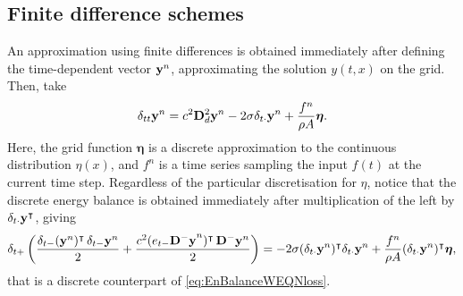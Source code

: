 \documentclass[11pt,twoside,a4paper,english]{book}
\newcommand{\etm}{e_{t-}}
\newcommand{\dtp}{\delta_{t+}}
\newcommand{\dtm}{\delta_{t-}}
\newcommand{\dtd}{\delta_{t\cdot}}
\newcommand{\dtt}{\delta_{tt}}
\begin{document}
\subsection{Finite difference schemes}

An approximation using finite differences is obtained immediately after defining the time-dependent vector ${\bf y}^n$, approximating the solution $y(t,x)$ on the grid. Then, take
\begin{equation}
\dtt {\bf y}^n = c^2 {\bf D}^2_d {\bf y}^n - 2\sigma \dtd {\bf y}^n + \frac{f^n}{\rho A}{\boldsymbol \eta}.
\end{equation}
Here, the grid function ${\boldsymbol \eta}$ is a discrete approximation to the continuous distribution $\eta(x)$, and $f^n$ is a time series sampling the input $f(t)$ at the current time step. Regardless of the particular discretisation for $\eta$, notice that the discrete energy balance is obtained immediately after multiplication of the left by $\dtd {\bf y}^\intercal$, giving
\begin{equation}
\dtp \left(\frac{\dtm ({\bf y}^n)^\intercal \, \dtm {\bf y}^n}{2} + \frac{c^2(\etm {\bf {\bf D}^-{\bf y}}^n)^\intercal \, {\bf D}^-{\bf y}^n}{2} \right) = -2\sigma (\dtd {\bf y}^n)^\intercal \dtd {\bf y}^n +  \frac{f^n}{\rho A}(\dtd {\bf y}^n)^\intercal {\boldsymbol \eta},
\end{equation}
that is a discrete counterpart of \eqref{eq:EnBalanceWEQNloss}. 
\end{document}
